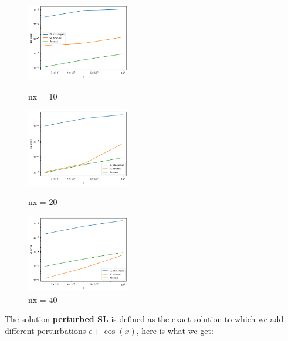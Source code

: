 \documentclass{article}
\begin{document}
\begin{figure}[!h]
    \centering
    \includegraphics[width=0.4\textwidth]{images/i110.png}
    \caption{nx = 10}
    \includegraphics[width=0.4\textwidth]{images/i120.png}
    \caption{nx = 20}
    \includegraphics[width=0.4\textwidth]{images/i1.png}
    \caption{nx = 40}
\end{figure}

The solution \textbf{perturbed SL} is defined as the exact solution to which we add different perturbations $\epsilon + \cos(x)$, here is what we get:\\

\newpage
\end{document}
